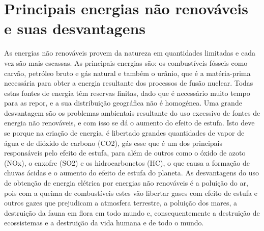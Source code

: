 \documentclass{report}
\begin{document}
\chapter{Principais energias não renováveis e suas desvantagens}

As energias não renováveis provem da natureza em quantidades limitadas e cada vez são mais escassas. As principais energias são: os combustíveis fósseis como carvão, petróleo bruto e gás natural e também o urânio, que é a matéria-prima necessária para obter a energia resultante dos processos de fusão nuclear. Todas estas fontes de energia têm reservas finitas, dado que é necessário muito tempo para as repor, e a sua distribuição geográfica não é homogénea.
Uma grande desvantagem são os problemas ambientais resultante do uso excessivo de fontes de energia não renováveis, e com isso se dá o aumento do efeito de estufa. Isto deve se porque na criação de energia, é libertado grandes quantidades de vapor de água e de dióxido de carbono (CO2), gás esse que é um dos principais responsáveis pelo efeito de estufa, para além de outros como o óxido de azoto (NOx), o enxofre (SO2) e os hidrocarbonetos (HC), o que causa a formação de chuvas ácidas e o aumento do efeito de estufa do planeta. 
As desvantagens do uso de obtenção de energia elétrica por energias não renováveis é a poluição do ar, pois com a queima de combustíveis estes vão libertar gases com efeito de estufa e outros gazes que prejudicam a atmosfera terrestre, a poluição dos mares, a destruição da fauna em flora em todo mundo e, consequentemente a destruição de ecossistemas e a destruição da vida humana e de todo o mundo. 
\end{document}
